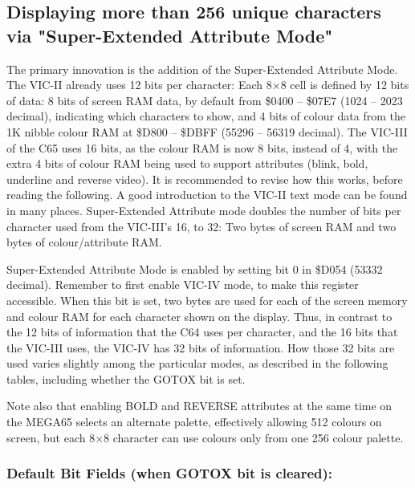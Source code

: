 \subsection{Displaying more than 256 unique characters via
"Super-Extended Attribute Mode"}

The primary innovation is the addition of the Super-Extended Attribute Mode. The VIC-II already uses 12 bits per character: Each 8$\times$8
cell is defined by 12 bits of data: 8 bits of screen RAM data, by
default from \$0400 -- \$07E7 (1024 -- 2023 decimal), indicating which
characters to show, and 4 bits of colour data from the 1K nibble colour
RAM at \$D800 -- \$DBFF (55296 -- 56319 decimal). The VIC-III of the
C65 uses 16 bits, as the colour RAM is now 8 bits, instead of 4, with
the extra 4 bits of colour RAM being used to support attributes (blink,
bold, underline and reverse video).  It is recommended to revise how
this works, before reading the following. A good introduction to the
VIC-II text mode can be found in many places.
Super-Extended Attribute mode doubles the number of bits per character used from the VIC-III’s 16, to 32: Two bytes of screen RAM and two bytes of
colour/attribute RAM.

Super-Extended Attribute Mode is enabled by setting bit 0 in \$D054
(53332 decimal). Remember to first enable VIC-IV mode, to make this
register accessible. When this bit is set, two bytes are used for each
of the screen memory and colour RAM for each character shown on the
display. Thus, in contrast to the 12 bits of information that the C64
uses per character, and the 16 bits that the VIC-III uses, the VIC-IV
has 32 bits of information.  How those 32 bits are used varies slightly
among the particular modes, as described in the following tables, 
including whether the GOTOX bit is set.

Note also that enabling BOLD and REVERSE attributes at the same time on the MEGA65 selects an alternate palette, effectively allowing 512 colours on screen, but each 8$\times$8 character can use colours only from one 256 colour palette.

\clearpage
\ifodd\value{page}\hbox{}\newpage\fi
\subsubsection{Default Bit Fields (when GOTOX bit is cleared):}

